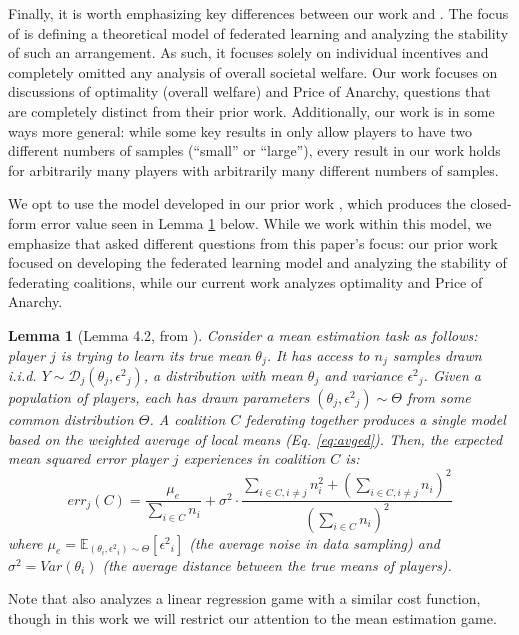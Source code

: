 \documentclass{article}
\newcommand{\p}[1]{\left( #1 \right)}
\newcommand{\cd}[0]{\cdot}
\newtheorem{lemma}{Lemma}
\newcommand{\gendist}[0]{\ensuremath{\Theta}}
\newcommand{\mean}[0]{\ensuremath{\theta}}
\newcommand{\mue}[0]{\ensuremath{\mu_e}}
\newcommand{\var}[0]{\ensuremath{\sigma^2}}
\newcommand{\sampledist}[0]{\ensuremath{\mathcal{D}}}
\newcommand{\ndraw}[0]{\ensuremath{n}}
\newcommand{\err}[0]{\ensuremath{\epsilon^2}}
\newcommand{\expparam}[1]{\ensuremath{\mathbb{E}_{(\mean_{#1}, \err_{#1}) \sim \gendist}}}
\newcommand{\Ymf}[0]{\ensuremath{Y}}
\newcommand{\col}[0]{\ensuremath{C}}
\begin{document}
{Finally, it is worth emphasizing key differences between our work and \cite{donahue2020model}. The focus of \cite{donahue2020model} is defining a theoretical model of federated learning and analyzing the stability of such an arrangement. As such, it focuses solely on individual incentives and completely omitted any analysis of overall societal welfare. Our work focuses on discussions of optimality (overall welfare) and Price of Anarchy, questions that are completely distinct from their prior work. Additionally, our work is in some ways more general: while some key results in \cite{donahue2020model} only allow players to have two different numbers of samples (\enquote{small} or \enquote{large}), every result in our work holds for arbitrarily many players with arbitrarily many different numbers of samples.}{

We opt to use the model developed in our prior work \citet{donahue2020model}, which produces the closed-form error value seen in Lemma \ref{lem:error} below. While we work within this model, we emphasize that \citet{donahue2020model} asked different questions from this paper's focus: our prior work focused on developing the federated learning model and analyzing the stability of federating coalitions, while our current work analyzes optimality and Price of Anarchy. 
\begin{lemma}[Lemma 4.2, from \cite{donahue2020model}]\label{lem:error}
Consider a mean estimation task as follows: player $j$ is trying to learn its true mean $\mean_j$. It has access to $\ndraw_j$ samples drawn i.i.d. $\Ymf \sim \sampledist_j(\mean_j, \err_j)$, a distribution with mean $\mean_j$ and variance $\err_j$. Given a population of players, each has drawn parameters $(\mean_j, \err_j) \sim \Theta$ from some common distribution $\Theta$. A coalition $\col$ federating together produces a single model based on the weighted average of local means (Eq. \ref{eq:avged}). Then, the expected mean squared error player $j$ experiences in coalition $\col$ is:
\begin{equation}\label{eq:err}
err_j(\col) = \frac{\mue}{\sum_{i \in \col} \ndraw_i} + \var \cd \frac{\sum_{i \in \col, i \ne j}\ndraw_i^2 + \p{\sum_{i\in \col, i \ne j}\ndraw_i}^2}{\p{\sum_{i \in \col}\ndraw_i}^2}
\end{equation}
where $\mue = \expparam{i}[\err_i]$ (the average noise in data sampling) and $\var = Var(\mean_i)$ (the average distance between the true means of players). 
\end{lemma}
Note that \cite{donahue2020model} also analyzes a linear regression game with a similar cost function, though in this work we will restrict our attention to the mean estimation game.

}
\end{document}
